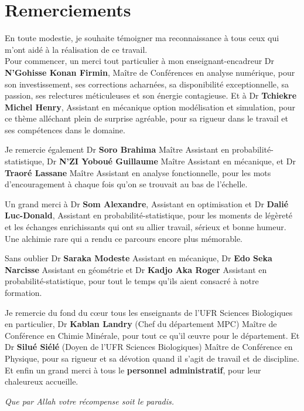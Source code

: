 \documentclass[12pt, oneside]{report} %
\theoremstyle{definition}
\theoremstyle{remark}
\begin{document}
	\chapter*{Remerciements}
	\begin{flushleft}
	En toute modestie, je souhaite témoigner ma reconnaissance à tous ceux qui m'ont aidé à la réalisation de ce travail. \\
	Pour commencer, un merci tout particulier à mon enseignant-encadreur Dr \textbf{N'Gohisse Konan Firmin}, Maître de Conférences en analyse numérique, pour son investissement, ses corrections acharnées, sa disponibilité exceptionnelle, sa passion, ses relectures méticuleuses et son énergie contagieuse. 
	Et à Dr \textbf{Tchiekre Michel Henry}, Assistant en mécanique option modélisation et simulation, pour ce thème alléchant plein de surprise agréable, pour sa rigueur dans le travail et ses compétences dans le domaine.   \
	
	Je remercie également Dr \textbf{Soro Brahima} Maître Assistant en probabilité-statistique, Dr \textbf{N’ZI Yoboué Guillaume} Maître Assistant en mécanique, et Dr \textbf{Traoré Lassane} Maître Assistant en analyse fonctionnelle, pour les mots d'encouragement à chaque fois qu'on se trouvait au bas de l'échelle.\
	
	Un grand merci à Dr \textbf{Som Alexandre}, Assistant en optimisation et Dr \textbf{Dalié Luc-Donald}, Assistant en probabilité-statistique, pour les moments de légèreté et les échanges enrichissants qui ont su allier travail, sérieux et bonne humeur. Une alchimie rare qui a rendu ce parcours encore plus mémorable. \
	
	Sans oublier Dr \textbf{Saraka Modeste} Assistant en mécanique, Dr \textbf{Edo Seka Narcisse} Assistant en géométrie et Dr \textbf{Kadjo Aka Roger} Assistant en probabilité-statistique, pour tout le temps qu'ils aient consacré à notre formation.\ 
	
	Je remercie du fond du cœur tous les enseignants de l'UFR Sciences Biologiques en particulier, Dr \textbf{Kablan Landry} (Chef du département MPC) Maître de Conférence en Chimie Minérale, pour tout ce qu'il œuvre pour le département. Et Dr \textbf{Silué Siélé} (Doyen de l'UFR Sciences Biologiques) Maître de Conférence en Physique, pour sa rigueur et sa dévotion quand il s'agit de travail et de discipline.\\ 
	Et enfin un grand merci à tous le \textbf{personnel administratif}, pour leur chaleureux accueille.
	\begin{center}
		\textit{Que par Allah votre récompense soit le paradis.}	  	
		\end{center}
	\end{flushleft}
	
\end{document}
